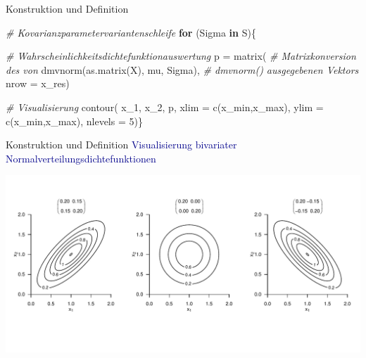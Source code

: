 \documentclass[
  8pt,
  ignorenonframetext,
]{beamer}
\newenvironment{Shaded}{\begin{snugshade}}{\end{snugshade}}
\newcommand{\AttributeTok}[1]{\textcolor[rgb]{0.77,0.63,0.00}{#1}}
\newcommand{\CommentTok}[1]{\textcolor[rgb]{0.56,0.35,0.01}{\textit{#1}}}
\newcommand{\ControlFlowTok}[1]{\textcolor[rgb]{0.13,0.29,0.53}{\textbf{#1}}}
\newcommand{\DecValTok}[1]{\textcolor[rgb]{0.00,0.00,0.81}{#1}}
\newcommand{\FunctionTok}[1]{\textcolor[rgb]{0.00,0.00,0.00}{#1}}
\newcommand{\NormalTok}[1]{#1}
\newcommand{\OtherTok}[1]{\textcolor[rgb]{0.56,0.35,0.01}{#1}}
\begin{document}
\begin{frame}[fragile]{Konstruktion und Definition}
\begin{Shaded}
\begin{Highlighting}[]
\CommentTok{\# Kovarianzparametervariantenschleife}
\ControlFlowTok{for}\NormalTok{ (Sigma }\ControlFlowTok{in}\NormalTok{ S)\{}

  \CommentTok{\# Wahrscheinlichkeitsdichtefunktionauswertung}
\NormalTok{  p      }\OtherTok{=} \FunctionTok{matrix}\NormalTok{(                                   }\CommentTok{\# Matrixkonversion des von}
                  \FunctionTok{dmvnorm}\NormalTok{(}\FunctionTok{as.matrix}\NormalTok{(X), mu, Sigma),  }\CommentTok{\# dmvnorm() ausgegebenen Vektors}
                  \AttributeTok{nrow =}\NormalTok{ x\_res)}

  \CommentTok{\# Visualisierung}
  \FunctionTok{contour}\NormalTok{(}
\NormalTok{  x\_1,}
\NormalTok{  x\_2,}
\NormalTok{  p,}
  \AttributeTok{xlim      =}  \FunctionTok{c}\NormalTok{(x\_min,x\_max),}
  \AttributeTok{ylim      =}  \FunctionTok{c}\NormalTok{(x\_min,x\_max),}
  \AttributeTok{nlevels   =} \DecValTok{5}\NormalTok{)\}}
\end{Highlighting}
\end{Shaded}
\end{frame}

\begin{frame}{Konstruktion und Definition}
\protect\hypertarget{konstruktion-und-definition-7}{}
\textcolor{darkblue}{Visualisierung bivariater Normalverteilungsdichtefunktionen}
\vspace{2mm}

\begin{center}\includegraphics[width=1\linewidth]{6_Abbildungen/mvda_6_mvnwdf} \end{center}
\end{frame}
\end{document}
